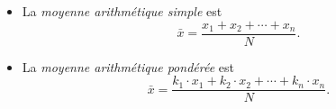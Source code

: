 \begin{defi}
\begin{itemize}
\begin{ex}
\begin{itemize}
{{                                                                \[
                                                                  y=\frac{\beta-\alpha}{b-a}(x-a)+\alpha.
                                                                \]
                                                                On en déduit
                                                                \[
                                                                  x=\frac{b-a}{\beta-\alpha}(y-\alpha)+a.
                                                                \]
                                                                Pour trouver $x_m$, on prend $y=m$ :
                                                                \[
                                                                  \propbox{x_m=\frac{b-a}{\beta-\alpha}(m-\alpha)+a}.
                                                                \]
                                                              }%
                                                            } :
                                                            \[
                                                                  70 + \frac{80 - 70}{1388} \cdot (1918 - 1522)
                                                                   = 72,853\text{ ans}            
                                                            \]
                                                            soit 72 ans 10 mois et 7 jours.%
                                                \end{itemize}
                                          \end{ex}
                                    \item La \emph{moyenne arithm\'etique simple} est 
                                          \[
                                          \bar{x} = \frac{x_1 + x_2 + \cdots + x_n}{N}.
                                          \]
                                    \item La \emph{moyenne arithm\'etique pond\'er\'ee} est 
                                          \[
                                          \bar{x} = \frac{k_1 \cdot x_1 + k_2 \cdot x_2 + \cdots + k_n \cdot x_n}{N}.
                                          \]
                                          \begin{ex}
                                                \begin{itemize}

\end{itemize}
\end{ex}
\end{itemize}
\end{defi}

